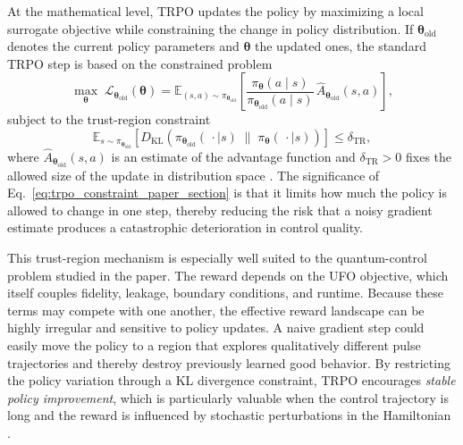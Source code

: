At the mathematical level, TRPO updates the policy by maximizing a local surrogate objective while constraining the change in policy distribution. If \(\bm{\theta}_{\mathrm{old}}\) denotes the current policy parameters and \(\bm{\theta}\) the updated ones, the standard TRPO step is based on the constrained problem
\begin{equation}
\max_{\bm{\theta}}
\;
\mathcal{L}_{\bm{\theta}_{\mathrm{old}}}(\bm{\theta})
=
\mathbb{E}_{(s,a)\sim\pi_{\bm{\theta}_{\mathrm{old}}}}
\left[
\frac{\pi_{\bm{\theta}}(a\mid s)}
{\pi_{\bm{\theta}_{\mathrm{old}}}(a\mid s)}
\,
\hat{A}_{\bm{\theta}_{\mathrm{old}}}(s,a)
\right],
\label{eq:trpo_surrogate_objective_paper_section}
\end{equation}
subject to the trust-region constraint
\begin{equation}
\mathbb{E}_{s\sim\pi_{\bm{\theta}_{\mathrm{old}}}}
\left[
D_{\mathrm{KL}}
\!\left(
\pi_{\bm{\theta}_{\mathrm{old}}}(\,\cdot\mid s)
\;\|\;
\pi_{\bm{\theta}}(\,\cdot\mid s)
\right)
\right]
\le
\delta_{\mathrm{TR}},
\label{eq:trpo_constraint_paper_section}
\end{equation}
where \(\hat{A}_{\bm{\theta}_{\mathrm{old}}}(s,a)\) is an estimate of the advantage function and \(\delta_{\mathrm{TR}}>0\) fixes the allowed size of the update in distribution space \cite{Schulman2015}. The significance of Eq.~\eqref{eq:trpo_constraint_paper_section} is that it limits how much the policy is allowed to change in one step, thereby reducing the risk that a noisy gradient estimate produces a catastrophic deterioration in control quality.

This trust-region mechanism is especially well suited to the quantum-control problem studied in the paper. The reward depends on the UFO objective, which itself couples fidelity, leakage, boundary conditions, and runtime. Because these terms may compete with one another, the effective reward landscape can be highly irregular and sensitive to policy updates. A naive gradient step could easily move the policy to a region that explores qualitatively different pulse trajectories and thereby destroy previously learned good behavior. By restricting the policy variation through a KL divergence constraint, TRPO encourages \emph{stable policy improvement}, which is particularly valuable when the control trajectory is long and the reward is influenced by stochastic perturbations in the Hamiltonian \cite{Niu2019,Schulman2015}.

